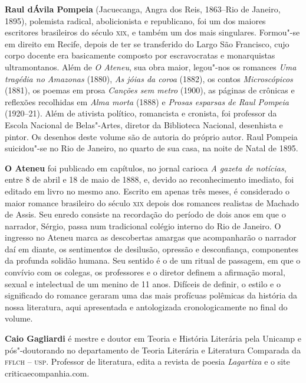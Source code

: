 \textbf{Raul dÁvila Pompeia} (Jacuecanga, Angra dos Reis, 1863--Rio de Janeiro, 1895), 
polemista radical, abolicionista e republicano, foi um dos maiores escritores
brasileiros do século \textsc{xix}, e também um dos mais singulares. Formou"-se
em direito em Recife, depois de ter se transferido do Largo São
Francisco, cujo corpo docente era basicamente composto por
escravocratas e monarquistas ultramontanos. Além de \textit{O
Ateneu}, sua obra maior, legou"-nos os romances
\textit{Uma tragédia no Amazonas} (1880),
\textit{As jóias da coroa} (1882), os contos
\textit{Microscópicos} (1881), os poemas em
prosa \textit{Canções sem metro} (1900), as páginas de crônicas 
e reflexões recolhidas em \textit{Alma
morta} (1888) e \textit{Prosas esparsas de
Raul Pompeia} (1920--21). Além de ativista político,
romancista e cronista, foi professor da Escola
Nacional de Belas"-Artes, diretor da Biblioteca Nacional, desenhista e
pintor. Os desenhos deste volume são de autoria do próprio autor. Raul
Pompeia suicidou"-se no Rio de Janeiro, no quarto de sua casa, na
noite de Natal de 1895.


\textbf{O Ateneu} foi publicado em capítulos,
no jornal carioca \textit{A gazeta de
notícias}, entre 8 de abril e 18 de maio de 1888, e,
devido ao reconhecimento imediato, foi editado em livro no mesmo ano.
Escrito em apenas três meses, é considerado o maior romance brasileiro do
século \textsc{xix} depois dos romances realistas de Machado de Assis. Seu
enredo consiste na recordação do período de dois anos em que o narrador,
Sérgio, passa num tradicional colégio interno do Rio de Janeiro. O
ingresso no Ateneu marca as descobertas amargas que acompanharão o
narrador daí em diante, os sentimentos de desilusão, opressão e
desconfiança, componentes da profunda solidão humana. Seu sentido é o
de um ritual de passagem, em que o convívio com os colegas, os
professores e o diretor definem a afirmação moral, sexual e intelectual
de um menino de 11 anos. Difíceis de definir, o estilo e o
significado do romance geraram uma das mais profícuas polêmicas da
história da nossa literatura, aqui apresentada e antologizada
cronologicamente no final do volume.


\textbf{Caio Gagliardi} é mestre e doutor em Teoria e
História Literária pela Unicamp e pós"-doutorando no departamento de
Teoria Literária e Literatura Comparada da \textsc{fflch -- usp}. Professor de
literatura, edita a revista de poesia \textit{Lagartixa}
e o site criticaecompanhia.com.


